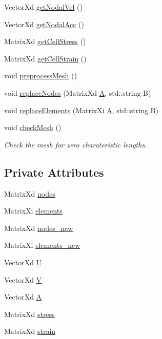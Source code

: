 \begin{DoxyCompactItemize}
\item 
Vector\+Xd \hyperlink{class_mesh_a052cd330cb8ccecf63e960a7afd0a6d9}{get\+Nodal\+Vel} ()
\item 
Vector\+Xd \hyperlink{class_mesh_ad41670edd4e6335071012837a58fb725}{get\+Nodal\+Acc} ()
\item 
Matrix\+Xd \hyperlink{class_mesh_a4ec62fd7219adcd406a167c1f6ee81e8}{get\+Cell\+Stress} ()
\item 
Matrix\+Xd \hyperlink{class_mesh_a1c54802401d00d14b390db2f0e615ebb}{get\+Cell\+Strain} ()
\item 
void \hyperlink{class_mesh_aa8a6f260e9589be4c0a2fcc146e696d5}{preprocess\+Mesh} ()
\item 
void \hyperlink{class_mesh_af03b49cbaf762652c9ff5ff7f4a6e668}{replace\+Nodes} (Matrix\+Xd \hyperlink{class_mesh_ae7202a4f96820433c69bc2ea4cc1b31d}{A}, std\+::string B)
\item 
void \hyperlink{class_mesh_a95ba7a96ec42ea4e0c191890f7faa2ab}{replace\+Elements} (Matrix\+Xi \hyperlink{class_mesh_ae7202a4f96820433c69bc2ea4cc1b31d}{A}, std\+::string B)
\item 
void \hyperlink{class_mesh_a894e41dd4280dfba75406eb8d0338a8e}{check\+Mesh} ()
\begin{DoxyCompactList}\small\item\em Check the mesh for zero charateristic lengths. \end{DoxyCompactList}\end{DoxyCompactItemize}
\subsection*{Private Attributes}
\begin{DoxyCompactItemize}
\item 
Matrix\+Xd \hyperlink{class_mesh_aa143447b8630a7a8bf2b045fddf372c3}{nodes}
\item 
Matrix\+Xi \hyperlink{class_mesh_a32aed9620eeb7eaf93a3f8c8f6e79bde}{elements}
\item 
Matrix\+Xd \hyperlink{class_mesh_aa9cae59f50d13339ed395ef567401cb8}{nodes\+\_\+new}
\item 
Matrix\+Xi \hyperlink{class_mesh_a8e099460dded463a5c13fb8d6066d312}{elements\+\_\+new}
\item 
Vector\+Xd \hyperlink{class_mesh_a950948f115bf07df771fa277042eedc1}{U}
\item 
Vector\+Xd \hyperlink{class_mesh_a69a99942ef6672d74a7ba569bdbd3c83}{V}
\item 
Vector\+Xd \hyperlink{class_mesh_ae7202a4f96820433c69bc2ea4cc1b31d}{A}
\item 
Matrix\+Xd \hyperlink{class_mesh_ae8f28f2627eeb9eccd9adcbdee1b2aa9}{stress}
\item 
Matrix\+Xd \hyperlink{class_mesh_a602850c13e7383308be4e65acd5b30fe}{strain}
\end{DoxyCompactItemize}


